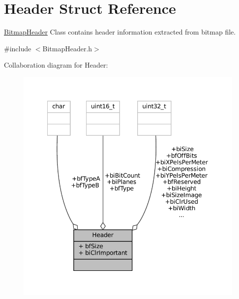 \hypertarget{structHeader}{}\section{Header Struct Reference}
\label{structHeader}


\mbox{\hyperlink{classBitmapHeader}{Bitmap\+Header}} Class contains header information extracted from bitmap file.  




{\ttfamily \#include $<$Bitmap\+Header.\+h$>$}



Collaboration diagram for Header\+:
\nopagebreak
\begin{figure}[H]
\begin{center}
\leavevmode
\includegraphics[width=349pt]{structHeader__coll__graph}
\end{center}
\end{figure}
